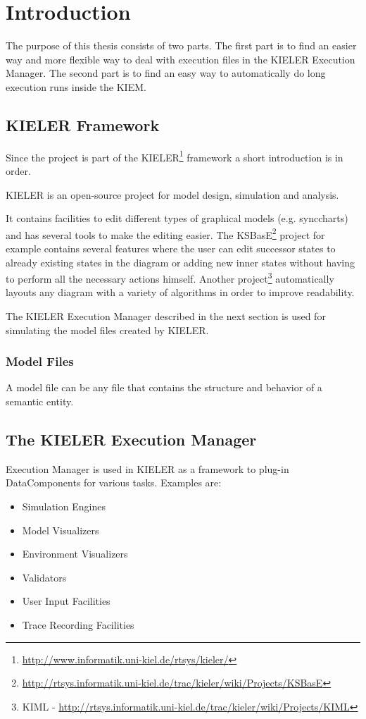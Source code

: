 \chapter{Introduction}
\label{chapter:introduction}
The purpose of this thesis consists of two parts. The first part is to find an easier way and
more flexible way to deal with execution files in the \ac{KIELER} Execution Manager. The second part
is to find an easy way to automatically do long execution runs inside the \ac{KIEM}.

\section{KIELER Framework}
\label{sec:introKieler}
Since the project is part of the \ac{KIELER}\footnote{\url{http://www.informatik.uni-kiel.de/rtsys/kieler/}}
framework a short introduction is in order.

\ac{KIELER} is an open-source project for model design, simulation and analysis. 

It contains facilities to edit different types of graphical models (e.g. synccharts) and has several
tools to make the editing easier. The \ac{KSBasE}\footnote{\url{http://rtsys.informatik.uni-kiel.de/trac/kieler/wiki/Projects/KSBasE}} 
project for example contains several features where the user can edit successor states to already existing states in the diagram or
adding new inner states without having to perform all the necessary actions himself. Another 
project\footnote{\ac{KIML} - \url{http://rtsys.informatik.uni-kiel.de/trac/kieler/wiki/Projects/KIML}}
automatically layouts any diagram with a variety of algorithms in order to improve readability.

The \ac{KIELER} Execution Manager described in the next section is used for simulating the
model files created by \ac{KIELER}.

\subsection{Model Files}
\label{section:IntroModelFile}
A model file can be any file that contains the structure and behavior of a semantic entity.

\section{The KIELER Execution Manager}
\label{sec:introKiem}
Execution Manager is used in KIELER as a framework to plug-in DataComponents for various tasks. Examples are:
\begin{itemize}
 \item Simulation Engines
 \item Model Visualizers
 \item Environment Visualizers
 \item Validators
 \item User Input Facilities
 \item Trace Recording Facilities 
\end{itemize}

